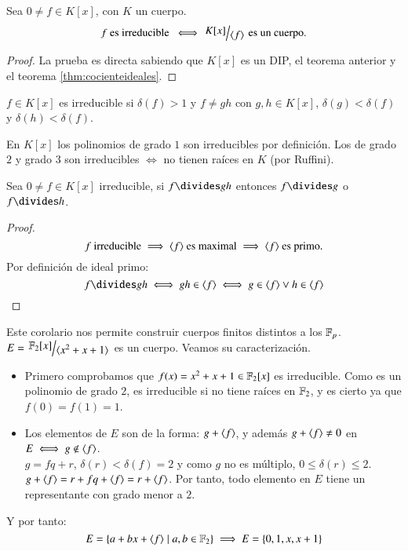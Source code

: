 \begin{cor}\label{cor:irreduciblecociente}
    Sea $0 \neq f \in K[x]$, con $K$ un cuerpo.
    $$
        f \text{ es irreducible } \iff \quo{K[x]}{\gen{f}} \text{ es un cuerpo}.
    $$
\end{cor}

\begin{proof}
    La prueba es directa sabiendo que $K[x]$ es un DIP, el teorema anterior y el teorema \ref{thm:cocienteideales}.
\end{proof}

\begin{obs}
    $f \in K[x]$ es irreducible si $\delta(f) > 1$ y $f \neq gh$ con $g, h \in K[x]$, $\delta(g) < \delta(f)$ y $\delta(h) < \delta(f)$.
\end{obs}

\begin{obs}
    En $K[x]$ los polinomios de grado $1$ son irreducibles por definición. Los de grado $2$ y grado $3$ son irreducibles $\iff$ no tienen raíces en $K$ (por Ruffini).
\end{obs}

\begin{cor}[Euclides]
    Sea $0 \neq f \in K[x]$ irreducible, si $f \divides gh$ entonces $f\divides g$ o $f \divides h$.
\end{cor}

\begin{proof}
    $$
        f \text{ irreducible} \implies \langle f\rangle \text{ es maximal} \implies \langle f\rangle \text{ es primo}.
    $$
    Por definición de ideal primo:
    $$
        f \divides gh \iff gh \in \gen{f} \iff g \in \gen{f} \lor h \in \gen{f}
    $$
\end{proof}

\begin{eg}
    Este corolario nos permite construir cuerpos finitos distintos a los $\mathbb{F}_p$.\\
    $E = \quo{\F_2[x]}{\gen{x^2+x+1}}$ es un cuerpo. Veamos su caracterización.
    \begin{itemize}
        \item Primero comprobamos que $f(x) = x^2 + x + 1 \in \mathbb{F}_2[x]$ es irreducible. Como es un polinomio de grado $2$, es irreducible si no tiene raíces en $\mathbb{F}_2$, y es cierto ya que $f(0) = f(1) = 1$.
        \item Los elementos de $E$ son de la forma: $g + \langle f\rangle$, y además $g + \langle f\rangle \neq 0$ en $E \iff g \notin \langle f\rangle$.\\
        $g = fq + r$, $\delta(r) < \delta(f) = 2$ y como $g$ no es múltiplo, $0 \leq \delta(r) \leq 2$.\\
        $g + \langle f\rangle = r + fq + \langle f\rangle = r + \langle f\rangle$. Por tanto, todo elemento en $E$ tiene un representante con grado  menor a $2$.
    \end{itemize}
    Y por tanto:
    $$
        E = \left\{a + bx + \langle f\rangle \mid a, b \in \mathbb{F}_2\right\} \implies E = \left\{0, 1, x, x+1\right\}
    $$
\end{eg}

